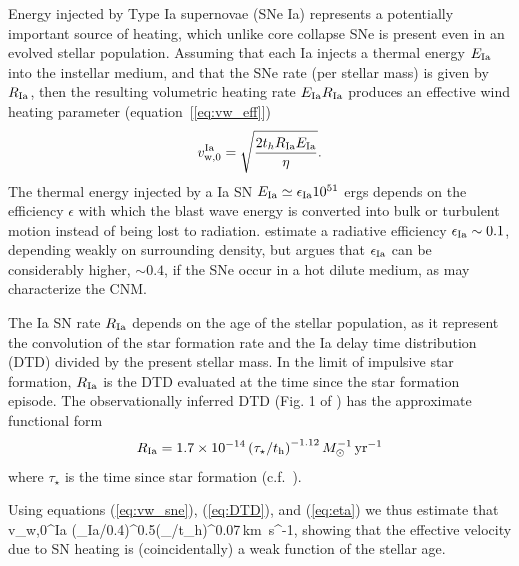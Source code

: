\documentclass[usenatbib,fleqn]{mn2e}
\newcommand{\RateIa}{R_{\rm Ia}}
\begin{document}
Energy injected by Type Ia supernovae (SNe Ia) represents a potentially important source of heating, which unlike core collapse SNe is present even in an evolved stellar population.  Assuming that each Ia injects a thermal energy $E_{\rm Ia}$ into the instellar medium, and that the SNe rate (per stellar mass) is given by $R_{\rm Ia}$, then the resulting volumetric heating rate $E_{\rm Ia}R_{\rm Ia}$ produces an effective wind heating parameter (equation~[\ref{eq:vw_eff}])
\begin{align}
    v_{\rm w,0}^{\rm Ia} =\sqrt{\frac{2 t_h R_{\rm Ia} E_{\rm Ia}}{\eta}} \label{eq:vw_sne}.
\end{align}
The thermal energy injected by a Ia SN $E_{\rm Ia} \simeq \epsilon_{\rm Ia} 10^{51}$ ergs depends on the efficiency $\epsilon$ with which the blast wave energy is converted into bulk or turbulent motion instead of being lost to radiation.  \cite{Thornton+98} estimate a radiative efficiency $\epsilon_{\rm Ia} \sim 0.1$, depending weakly on surrounding density, but \citet{Sharma+14} argues that $\epsilon_{\rm Ia}$ can be considerably higher, $\sim 0.4$, if the SNe occur in a hot dilute medium, as may characterize the CNM.

The Ia SN rate $\RateIa$ depends on the age of the stellar population, as it represent the convolution of the star formation rate and the Ia delay time distribution (DTD) divided by the present stellar mass.  In the limit of impulsive star formation, $\RateIa$ is the DTD evaluated at the time since the star formation episode.  The observationally inferred DTD (Fig. 1 of \citealt{MaozMannucci+:2012a}) has the approximate functional form
\begin{align}
    R_{\rm Ia} =1.7\times 10^{-14}\left(\tau_{\star}/t_{\rm h}\right)^{-1.12} M_{\odot}^{-1}\,{\rm yr^{-1}}
\label{eq:DTD}
  \end{align}
where $\tau_{\star}$ is the time since star formation (c.f.~\citealt{Scannapieco&Bildsten05}).

Using equations (\ref{eq:vw_sne}), (\ref{eq:DTD}), and (\ref{eq:eta}) we thus estimate that
\be
v_{w,0}^{\rm Ia} (\epsilon_{\rm Ia}/0.4)^{0.5}(\tau_{\star}/t_{\rm h})^{0.07}\,{\rm km \,s^{-1}},
\ee
showing that the effective velocity due to SN heating is (coincidentally) a weak function of the stellar age.  
\end{document}
